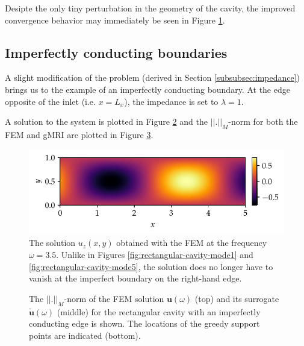 \documentclass[11pt, a4paper]{article}
\begin{document}
Desipte the only tiny perturbation in the geometry of the cavity, the improved
convergence behavior may immediately be seen in Figure \ref{fig:rectangular-cubby-trace-errornorm}.

\begin{figure}[ht]
    \centering
    
    \caption{}
    \label{fig:rectangular-cubby-trace-errornorm}
\end{figure}

\clearpage
\subsection{Imperfectly conducting boundaries}
\label{subsec:examples-impedance}

A slight modification of the problem (derived in Section \ref{subsubsec:impedance})
brings us to the example of an imperfectly conducting boundary. At the edge 
opposite of the inlet (i.e. $x=L_x$), the impedance is set to $\lambda=1$.

A solution to the system is plotted in Figure \ref{fig:imperfect-conductor-solution}
and the $||.||_M$-norm for both the \acrshort{FEM} and \acrshort{gMRI}
are plotted in Figure \ref{fig:imperfect-conductor-norms}.

\begin{figure}[ht]
    \centering
    \includegraphics{plots/imperfect_conductor_solution.pdf}
    \caption{The solution $u_z(x, y)$ obtained with the \acrshort{FEM} at the
    frequency $\omega = 3.5$. Unlike in Figures \ref{fig:rectangular-cavity-mode1}
    and \ref{fig:rectangular-cavity-mode5}, the solution does no longer have to
    vanish at the imperfect boundary on the right-hand edge.}
    \label{fig:imperfect-conductor-solution}
\end{figure}

\begin{figure}[ht]
    \centering
    
    \caption{The $||.||_M$-norm of the \acrshort{FEM} solution $\mathbf{u}(\omega)$ (top) and
    its surrogate $\mathbf{\tilde{u}}(\omega)$ (middle) for the rectangular cavity with
    an imperfectly conducting edge is shown. The locations of the greedy support
    points are indicated (bottom).}
    \label{fig:imperfect-conductor-norms}
\end{figure}
\end{document}
